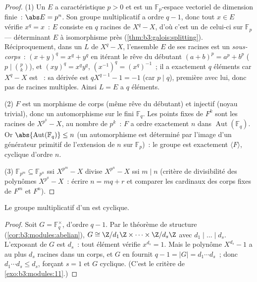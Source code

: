\begin{proof}
(1) Un  $E$ a caractéristique $p > 0$ et est un
$\mathbb F_p$-espace vectoriel de dimension finie~: $\abs E =
p^n$. Son groupe multiplicatif a ordre $q - 1$, donc tout $x
\in E$ vérifie $x^q = x$~: $E$ consiste en $q$ racines de $X^q
- X$, d'où c'est un  de celui-ci sur
$\mathbb F_p$ --- déterminant $E$ à isomorphisme près
(\cref{thm:b3:galois:splitting}). Réciproquement, dans un
 $L$ de $X^q - X$, l'ensemble $E$ de ses
racines est un \emph{sous-corps}~: $(x + y)^q = x^q + y^q$ en
itérant le rêve du débutant $(a+b)^p = a^p + b^p$ ($p \mid
\binom pk$), et $(xy)^q = x^qy^q$, $(x^{-1})^q = (x^q)^{-1}$~;
il a exactement $q$ éléments car $X^q - X$ est ~: sa
dérivée est $qX^{q-1} - 1 = -1$ (car $p \mid q$), première
avec lui, donc pas de racines multiples. Ainsi $L = E$ a $q$
éléments.

(2) $F$ est un morphisme de corps (même rêve du débutant) et
injectif (noyau trivial), donc un automorphisme sur le fini
$\mathbb F_q$. Les points fixes de $F^k$ sont les racines de
$X^{p^k} - X$, au nombre de $p^k$~: $F$ a ordre exactement $n$
dans $\operatorname{Aut}(\mathbb F_q)$. Or $\abs{\operatorname
{Aut}(\mathbb F_q)} \leq n$ (un automorphisme est déterminé
par l'image d'un générateur primitif de l'extension de 
$n$ sur $\mathbb F_p$)~: le groupe est exactement $\langle F
\rangle$, cyclique d'ordre $n$.

(3) $\mathbb F_{p^m} \subseteq \mathbb F_{p^n}$ ssi $X^{p^m} -
X$ divise $X^{p^n} - X$ ssi $m \mid n$ (critère de divisibilité
des polynômes $X^{p^a} - X$~: écrire $n = mq + r$ et comparer
les cardinaux des corps fixes de $F^m$ et $F^n$).
\end{proof}

\begin{theorem}\label{thm:b3:galois:cyclic}
Le groupe multiplicatif d'un  est cyclique.
\end{theorem}

\begin{proof}
Soit $G = \mathbb F_q^\times$, d'ordre $q - 1$. Par le théorème
de structure (\cref{cor:b3:modules:abelian}), $G \cong
\Z/d_1\Z \times \cdots \times \Z/d_s\Z$ avec $d_1 \mid \dots
\mid d_s$. L'exposant de $G$ est $d_s$~: tout élément vérifie
$x^{d_s} = 1$. Mais le polynôme $X^{d_s} - 1$ a au plus $d_s$
racines dans un corps, et $G$ en fournit $q - 1 = |G| =
d_1\cdots d_s$~; donc $d_1\cdots d_s \leq d_s$, forçant $s = 1$
et $G$ cyclique. (C'est le critère de \cref{exo:b3:modules:11}.)
\end{proof}

